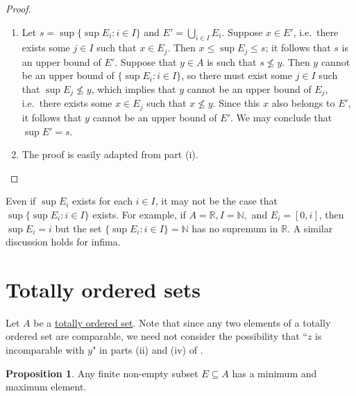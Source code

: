 \documentclass[12pt]{article}
\theoremstyle{definition}
\newtheorem{proposition}[definition]{Proposition}
\begin{document}
\begin{proof}
    \begin{enumerate}[label = (\roman*)]
        \item Let \( s = \sup \{ \sup E_i : i \in I \} \) and \( E' = \bigcup_{i \in I} E_i \). Suppose \( x \in E' \), i.e.\ there exists some \( j \in I \) such that \( x \in E_j \). Then \( x \leq \sup E_j \leq s \); it follows that \( s \) is an upper bound of \( E' \). Suppose that \( y \in A \)  is such that \( s \not\leq y \). Then \( y \) cannot be an upper bound of \( \{ \sup E_i : i \in I \} \), so there must exist some \( j \in I \) such that \( \sup E_j \not\leq y \), which implies that \( y \) cannot be an upper bound of \( E_j \), i.e.\ there exists some \( x \in E_j \) such that \( x \not\leq y \). Since this \( x \) also belongs to \( E' \), it follows that \( y \) cannot be an upper bound of \( E' \). We may conclude that \( \sup E' = s \).

        \item The proof is easily adapted from part (i). \qedhere
    \end{enumerate}
\end{proof}

Even if \( \sup E_i \) exists for each \( i \in I \), it may not be the case that \( \sup \{ \sup E_i : i \in I \} \) exists. For example, if \( A = \mathbb{R}, I = \mathbb{N}, \) and \( E_i = [0, i] \), then \( \sup E_i = i \) but the set \( \{ \sup E_i : i \in I \} = \mathbb{N} \) has no supremum in \( \mathbb{R} \). A similar discussion holds for infima.

\section{Totally ordered sets}
\label{sec:totally_ordered_sets}

Let \( A \) be a \href{https://en.wikipedia.org/wiki/Total_order}{totally ordered set}. Note that since any two elements of a totally ordered set are comparable, we need not consider the possibility that ``\( z \) is incomparable with \( y \)" in parts (ii) and (iv) of .

\begin{proposition}
\label{prop:finite_set_has_min_max_total_order}
    Any finite non-empty subset \( E \subseteq A \) has a minimum and maximum element.
\end{proposition}
\end{document}
